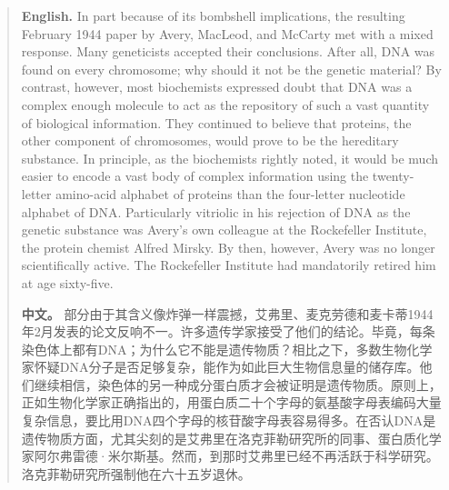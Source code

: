 \begin{quote}
\noindent\textbf{English.} In part because of its bombshell implications, the resulting February 1944 paper by Avery, MacLeod, and McCarty met with a mixed response. Many geneticists accepted their conclusions. After all, DNA was found on every chromosome; why should it not be the genetic material? By contrast, however, most biochemists expressed doubt that DNA was a complex enough molecule to act as the repository of such a vast quantity of biological information. They continued to believe that proteins, the other component of chromosomes, would prove to be the hereditary substance. In principle, as the biochemists rightly noted, it would be much easier to encode a vast body of complex information using the twenty-letter amino-acid alphabet of proteins than the four-letter nucleotide alphabet of DNA. Particularly vitriolic in his rejection of DNA as the genetic substance was Avery's own colleague at the Rockefeller Institute, the protein chemist Alfred Mirsky. By then, however, Avery was no longer scientifically active. The Rockefeller Institute had mandatorily retired him at age sixty-five.

\smallskip
\noindent\textbf{中文。} 部分由于其含义像炸弹一样震撼，艾弗里、麦克劳德和麦卡蒂1944年2月发表的论文反响不一。许多遗传学家接受了他们的结论。毕竟，每条染色体上都有DNA；为什么它不能是遗传物质？相比之下，多数生物化学家怀疑DNA分子是否足够复杂，能作为如此巨大生物信息量的储存库。他们继续相信，染色体的另一种成分蛋白质才会被证明是遗传物质。原则上，正如生物化学家正确指出的，用蛋白质二十个字母的氨基酸字母表编码大量复杂信息，要比用DNA四个字母的核苷酸字母表容易得多。在否认DNA是遗传物质方面，尤其尖刻的是艾弗里在洛克菲勒研究所的同事、蛋白质化学家阿尔弗雷德·米尔斯基。然而，到那时艾弗里已经不再活跃于科学研究。洛克菲勒研究所强制他在六十五岁退休。
\end{quote}

